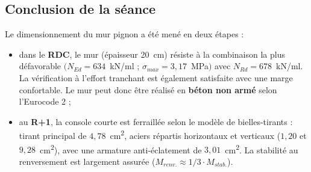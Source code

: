 \subsection{Conclusion de la séance}

Le dimensionnement du mur pignon a été mené en deux étapes :
\begin{itemize}
  \item dans le \textbf{RDC}, le mur (épaisseur 20~cm) résiste à la combinaison la plus défavorable $(N_{Ed} = 634$~kN/ml ; $\sigma_{max} = 3{,}17$~MPa$)$ avec $N_{Rd} = 678$~kN/ml. La vérification à l'effort tranchant est également satisfaite avec une marge confortable. Le mur peut donc être réalisé en \textbf{béton non armé} selon l'Eurocode 2 ;
  \item au \textbf{R+1}, la console courte est ferraillée selon le modèle de bielles-tirants : tirant principal de $4{,}78$~cm\textsuperscript{2}, aciers répartis horizontaux et verticaux ($1{,}20$ et $9{,}28$~cm\textsuperscript{2}), avec une armature anti-éclatement de $3{,}01$~cm\textsuperscript{2}. La stabilité au renversement est largement assurée ($M_{renv.} \approx 1/3 \cdot M_{stab.}$).
\end{itemize}

